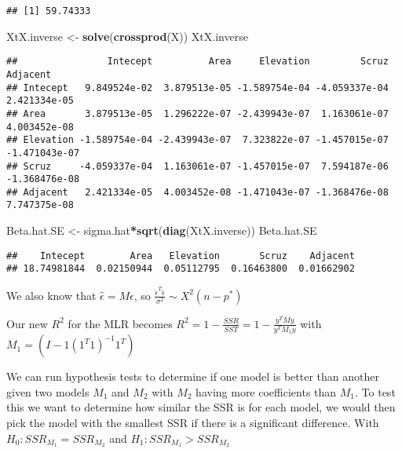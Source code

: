\documentclass[
]{article}
\newenvironment{Shaded}{\begin{snugshade}}{\end{snugshade}}
\newcommand{\FunctionTok}[1]{\textcolor[rgb]{0.13,0.29,0.53}{\textbf{#1}}}
\newcommand{\NormalTok}[1]{#1}
\newcommand{\OtherTok}[1]{\textcolor[rgb]{0.56,0.35,0.01}{#1}}
\newcommand{\SpecialCharTok}[1]{\textcolor[rgb]{0.81,0.36,0.00}{\textbf{#1}}}
\begin{document}
\begin{verbatim}
## [1] 59.74333
\end{verbatim}

\begin{Shaded}
\begin{Highlighting}[]
\NormalTok{XtX.inverse }\OtherTok{\textless{}{-}} \FunctionTok{solve}\NormalTok{(}\FunctionTok{crossprod}\NormalTok{(X))}
\NormalTok{XtX.inverse}
\end{Highlighting}
\end{Shaded}

\begin{verbatim}
##                Intecept          Area     Elevation         Scruz      Adjacent
## Intecept   9.849524e-02  3.879513e-05 -1.589754e-04 -4.059337e-04  2.421334e-05
## Area       3.879513e-05  1.296222e-07 -2.439943e-07  1.163061e-07  4.003452e-08
## Elevation -1.589754e-04 -2.439943e-07  7.323822e-07 -1.457015e-07 -1.471043e-07
## Scruz     -4.059337e-04  1.163061e-07 -1.457015e-07  7.594187e-06 -1.368476e-08
## Adjacent   2.421334e-05  4.003452e-08 -1.471043e-07 -1.368476e-08  7.747375e-08
\end{verbatim}

\begin{Shaded}
\begin{Highlighting}[]
\NormalTok{Beta.hat.SE }\OtherTok{\textless{}{-}}\NormalTok{ sigma.hat}\SpecialCharTok{*}\FunctionTok{sqrt}\NormalTok{(}\FunctionTok{diag}\NormalTok{(XtX.inverse))}
\NormalTok{Beta.hat.SE}
\end{Highlighting}
\end{Shaded}

\begin{verbatim}
##    Intecept        Area   Elevation       Scruz    Adjacent 
## 18.74981844  0.02150944  0.05112795  0.16463800  0.01662902
\end{verbatim}

We also know that \(\hat{\epsilon}=M\epsilon\), so
\(\frac{\hat{\epsilon}^T\hat{\epsilon}}{\sigma^2} \sim X^2(n-p^*)\)

Our new \(R^2\) for the MLR becomes
\(R^2=1-\frac{SSR}{SST}=1-\frac{y^TMy}{y^TM_1y}\) with
\(M_1=(I-1(1^T1)^{-1}1^T)\)

We can run hypothesis tests to determine if one model is better than
another given two models \(M_1\) and \(M_2\) with \(M_2\) having more
coefficients than \(M_1\). To test this we want to determine how similar
the SSR is for each model, we would then pick the model with the
smallest SSR if there is a significant difference. With
\(H_0:SSR_{M_1}=SSR_{M_2}\) and \(H_1:SSR_{M_1}\gt SSR_{M_2}\)
\end{document}

